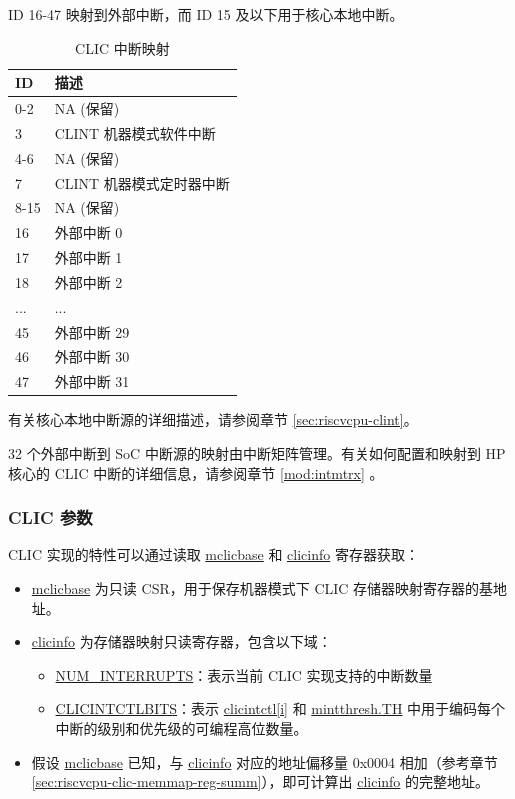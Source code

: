 \documentclass[main\_\_CN.tex]{subfiles}
\begin{document}
ID 16-47 映射到外部中断，而 ID 15 及以下用于核心本地中断。

\begin{longtable}{ | l | l | }
\caption{CLIC 中断映射}
\label{tab:riscvcpu-clic-intmap-table}
\\ \hline
\rowcolor{lightgray}
ID & 描述 \\ \hline
0-2 & NA (保留) \\ \hline
3 & CLINT 机器模式软件中断 \\ \hline
4-6 & NA (保留) \\ \hline
7 & CLINT 机器模式定时器中断 \\ \hline
8-15 & NA (保留) \\ \hline
16 & 外部中断 0 \\ \hline
17 & 外部中断 1 \\ \hline
18 & 外部中断 2 \\ \hline
... & ... \\ \hline
45 & 外部中断 29 \\ \hline
46 & 外部中断 30 \\ \hline
47 & 外部中断 31 \\ \hline
\end{longtable}

有关核心本地中断源的详细描述，请参阅章节 \ref{sec:riscvcpu-clint}。

32 个外部中断到 SoC 中断源的映射由中断矩阵管理。有关如何配置和映射到 HP 核心的 CLIC 中断的详细信息，请参阅章节 \ref{mod:intmtrx} \textit{}。

\hypertarget{riscvcpu-clic-params}{}
\subsubsection{CLIC 参数}
\label{sec:riscvcpu-clic-params}

CLIC 实现的特性可以通过读取 \hyperref[regdesc:MCLICBASE_REG]{mclicbase} 和 \hyperref[regdesc:CLICINFO_REG]{clicinfo} 寄存器获取：

\begin{itemize}
    \item \hyperref[regdesc:MCLICBASE_REG]{mclicbase} 为只读 CSR，用于保存机器模式下 CLIC 存储器映射寄存器的基地址。
    \item \hyperref[regdesc:CLICINFO_REG]{clicinfo} 为存储器映射只读寄存器，包含以下域：
    \begin{itemize}
        \item \hyperref[fielddesc:CLICINFO_NUM_INTERRUPTS]{NUM\_INTERRUPTS}：表示当前 CLIC 实现支持的中断数量
        \item \hyperref[fielddesc:CLICINFO_CLICINTCTLBITS]{CLICINTCTLBITS}：表示 \hyperref[regdesc:MCLICINTCTL_REG_i]{clicintctl[i]} 和 \hyperref[fielddesc:MINTTHRESH_TH]{{mintthresh.TH}} 中用于编码每个中断的级别和优先级的可编程高位数量。
    \end{itemize}
    \item 假设 \hyperref[fielddesc:MCLICBASE]{mclicbase} 已知，与 \hyperref[regdesc:CLICINFO_REG]{clicinfo} 对应的地址偏移量 0x0004 相加（参考章节 \ref{sec:riscvcpu-clic-memmap-reg-summ}），即可计算出 \hyperref[regdesc:CLICINFO_REG]{clicinfo} 的完整地址。
\end{itemize}
\end{document}

